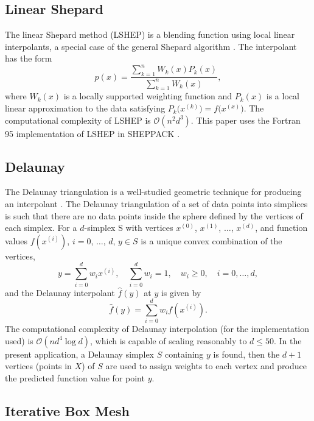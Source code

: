 \documentclass[sigconf]{acmart}
\begin{document}
\subsection{Linear Shepard}
The linear Shepard method (LSHEP) is a blending function using local linear interpolants, a special case of the general Shepard algorithm \cite{thacker2010algorithm}. The interpolant has the form
$$ p(x) = \frac{\sum\limits_{k=1}^{n}W_k(x)P_k(x)}{\sum\limits_{k=1}^{n}W_k(x)} ,$$
where $W_k(x)$ is a locally supported weighting function and $P_k(x)$ is a local linear approximation to the data satisfying $P_k\big(x^{(k)}\big) = f\big(x^{(x)}\big)$. The computational complexity of LSHEP is $\mathcal{O}(n^2d^3)$. This paper uses the Fortran 95 implementation of LSHEP in SHEPPACK \cite{thacker2010algorithm}.


\subsection{Delaunay}
\label{sec:delaunay}

The Delaunay triangulation is a well-studied geometric technique for producing an interpolant \cite{lee1980two}. The Delaunay triangulation of a set of data points into simplices is such that there are no data points inside the sphere defined by the vertices of each simplex. For a $d$-simplex S with vertices $x^{(0)}$, $x^{(1)}$, $\ldots$, $x^{(d)}$, and function values $f(x^{(i)})$, $i=0$, $\ldots$, $d$, $y \in S$ is a unique convex combination of the vertices,
$$ y = \sum_{i=0}^{d} w_i x^{(i)}, \quad \sum_{i=0}^{d} w_i = 1, \quad w_i \geq 0, \quad i=0,\ldots,d, $$
and the Delaunay interpolant $\hat f(y)$ at $y$ is given by
$$ \hat f(y) = \sum_{i=0}^{d} w_i f(x^{(i)}). $$
The computational complexity of Delaunay interpolation (for the implementation used) is $\mathcal{O}(n d^4 \log d)$, which is capable of scaling reasonably to $d \leq 50$. In the present application, a Delaunay simplex $S$ containing $y$ is found, then the $d+1$ vertices (points in $X$) of $S$ are used to assign weights to each vertex and produce the predicted function value for point $y$.

\subsection{Iterative Box Mesh}
\label{sec:max_box_mesh}
\end{document}
